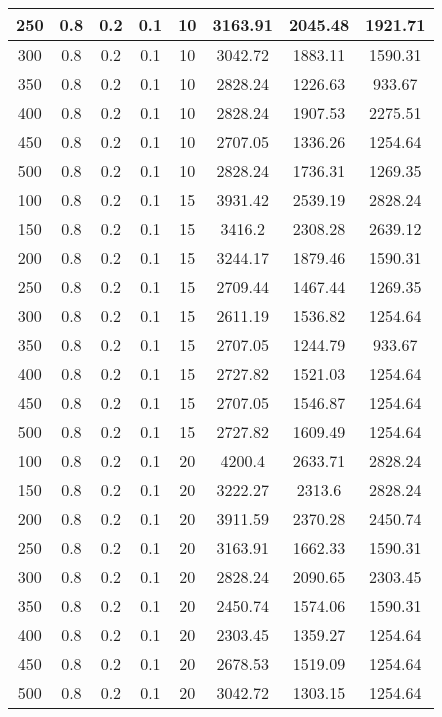 \documentclass[a4paper, 12pt]{extreport}
\begin{document}
\begin{itemize}
\begin{longtable}{|c|c|c|c|c|c|c|c|}
			250 & 0.8 & 0.2 & 0.1 & 10 & 3163.91 & 2045.48 & 1921.71 \\\hline
			300 & 0.8 & 0.2 & 0.1 & 10 & 3042.72 & 1883.11 & 1590.31 \\\hline
			350 & 0.8 & 0.2 & 0.1 & 10 & 2828.24 & 1226.63 & 933.67 \\\hline
			400 & 0.8 & 0.2 & 0.1 & 10 & 2828.24 & 1907.53 & 2275.51 \\\hline
			450 & 0.8 & 0.2 & 0.1 & 10 & 2707.05 & 1336.26 & 1254.64 \\\hline
			500 & 0.8 & 0.2 & 0.1 & 10 & 2828.24 & 1736.31 & 1269.35 \\\hline
			100 & 0.8 & 0.2 & 0.1 & 15 & 3931.42 & 2539.19 & 2828.24 \\\hline
			150 & 0.8 & 0.2 & 0.1 & 15 & 3416.2 & 2308.28 & 2639.12 \\\hline
			200 & 0.8 & 0.2 & 0.1 & 15 & 3244.17 & 1879.46 & 1590.31 \\\hline
			250 & 0.8 & 0.2 & 0.1 & 15 & 2709.44 & 1467.44 & 1269.35 \\\hline
			300 & 0.8 & 0.2 & 0.1 & 15 & 2611.19 & 1536.82 & 1254.64 \\\hline
			350 & 0.8 & 0.2 & 0.1 & 15 & 2707.05 & 1244.79 & 933.67 \\\hline
			400 & 0.8 & 0.2 & 0.1 & 15 & 2727.82 & 1521.03 & 1254.64 \\\hline
			450 & 0.8 & 0.2 & 0.1 & 15 & 2707.05 & 1546.87 & 1254.64 \\\hline
			500 & 0.8 & 0.2 & 0.1 & 15 & 2727.82 & 1609.49 & 1254.64 \\\hline
			100 & 0.8 & 0.2 & 0.1 & 20 & 4200.4 & 2633.71 & 2828.24 \\\hline
			150 & 0.8 & 0.2 & 0.1 & 20 & 3222.27 & 2313.6 & 2828.24 \\\hline
			200 & 0.8 & 0.2 & 0.1 & 20 & 3911.59 & 2370.28 & 2450.74 \\\hline
			250 & 0.8 & 0.2 & 0.1 & 20 & 3163.91 & 1662.33 & 1590.31 \\\hline
			300 & 0.8 & 0.2 & 0.1 & 20 & 2828.24 & 2090.65 & 2303.45 \\\hline
			350 & 0.8 & 0.2 & 0.1 & 20 & 2450.74 & 1574.06 & 1590.31 \\\hline
			400 & 0.8 & 0.2 & 0.1 & 20 & 2303.45 & 1359.27 & 1254.64 \\\hline
			450 & 0.8 & 0.2 & 0.1 & 20 & 2678.53 & 1519.09 & 1254.64 \\\hline
			500 & 0.8 & 0.2 & 0.1 & 20 & 3042.72 & 1303.15 & 1254.64 \\\hline

\end{longtable}
\end{itemize}
\end{document}
